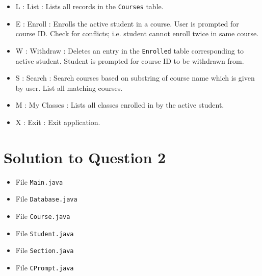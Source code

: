 \begin{itemize}
\item[] L : List : Lists all records in the \texttt{Courses} table.
\item[] E : Enroll : Enrolls the active student in a course.
User is prompted for course ID.
Check for conflicts; i.e. student cannot enroll twice in same course.
\item[] W : Withdraw : Deletes an entry in the \texttt{Enrolled} table corresponding to active student.
Student is prompted for course ID to be withdrawn from.
\item[] S : Search : Search courses based on substring of course name which is given by user.
List all matching courses.
\item[] M : My Classes : Lists all classes enrolled in by the active student.
\item[] X : Exit : Exit application.
\end{itemize}

\section*{Solution to Question 2}

\lstset{language=java}
\lstset{tabsize=2}
\begin{itemize}

\item File \texttt{Main.java}


\item File \texttt{Database.java}


\item File \texttt{Course.java}


\item File \texttt{Student.java}


\item File \texttt{Section.java}


\item File \texttt{CPrompt.java}


\end{itemize}
